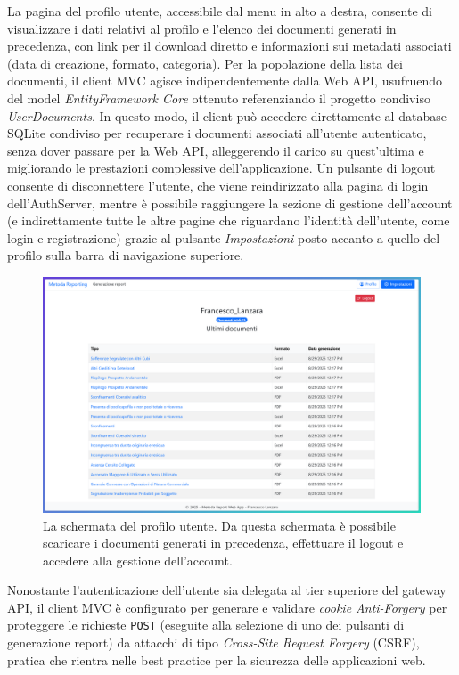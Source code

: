 La pagina del profilo utente, accessibile dal menu in alto a destra, consente di visualizzare i dati relativi al profilo e l'elenco dei documenti generati in precedenza, con link per il download diretto e informazioni sui metadati associati (data di creazione, formato, categoria). Per la popolazione della lista dei documenti, il client MVC agisce indipendentemente dalla Web API, usufruendo del model \emph{EntityFramework Core} ottenuto referenziando il progetto condiviso \emph{UserDocuments}. In questo modo, il client può accedere direttamente al database SQLite condiviso per recuperare i documenti associati all'utente autenticato, senza dover passare per la Web API, alleggerendo il carico su quest'ultima e migliorando le prestazioni complessive dell'applicazione.
Un pulsante di logout consente di disconnettere l'utente, che viene reindirizzato alla pagina di login dell'AuthServer, mentre è possibile raggiungere la sezione di gestione dell'account (e indirettamente tutte le altre pagine che riguardano l'identità dell'utente, come login e registrazione) grazie al pulsante \emph{Impostazioni} posto accanto a quello del profilo sulla barra di navigazione superiore.

\begin{figure}[H]
        \centering
        \includegraphics[width=15.5cm]{fig/screen_profile.png}
        \caption[Schermata profilo]{La schermata del profilo utente. Da questa schermata è possibile scaricare i documenti generati in precedenza, effettuare il logout e accedere alla gestione dell'account.}
\end{figure}

Nonostante l'autenticazione dell'utente sia delegata al tier superiore del gateway API, il client MVC è configurato per generare e validare \emph{cookie Anti-Forgery} per proteggere le richieste \texttt{POST} (eseguite alla selezione di uno dei pulsanti di generazione report) da attacchi di tipo \emph{Cross-Site Request Forgery} (CSRF), pratica che rientra nelle best practice per la sicurezza delle applicazioni web.

